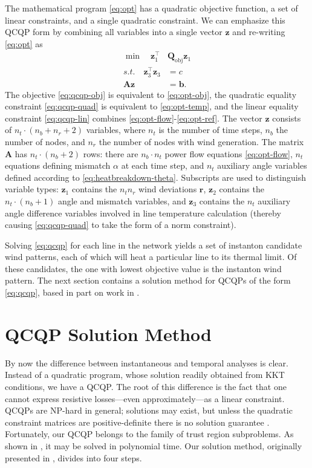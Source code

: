 \documentclass[journal,twoside]{IEEEtran}
\renewcommand{\vec}[1]{\mathbf{#1}}
\begin{document}
The mathematical program \eqref{eq:opt} has a quadratic objective function, a set of linear constraints, and a single quadratic constraint. We can emphasize this QCQP form by combining all variables into a single vector $\mathbf{z}$ and re-writing \eqref{eq:opt} as
\begin{subequations}\label{eq:qcqp}
\begin{align}
\label{eq:qcqp-obj} \min\quad \vec{z}_1^\top &\mathbf{Q}_\text{obj} \vec{z}_1 \\
\label{eq:qcqp-quad}s.t.\quad \vec{z}_3^\top \vec{z}_3 &= c \\
\label{eq:qcqp-lin} \mathbf{A}\vec{z} &= \vec{b}.
\end{align}
\end{subequations}
The objective \eqref{eq:qcqp-obj} is equivalent to \eqref{eq:opt-obj}, the quadratic equality constraint \eqref{eq:qcqp-quad} is equivalent to \eqref{eq:opt-temp}, and the linear equality constraint \eqref{eq:qcqp-lin} combines \eqref{eq:opt-flow}-\eqref{eq:opt-ref}. The vector $\vec{z}$ consists of $n_t\cdot(n_b+n_r+2)$ variables, where $n_t$ is the number of time steps, $n_b$ the number of nodes, and $n_r$ the number of nodes with wind generation. The matrix $\mathbf{A}$ has $n_t\cdot(n_b+2)$ rows: there are $n_b\cdot n_t$ power flow equations \eqref{eq:opt-flow}, $n_t$ equations defining mismatch $\alpha$ at each time step, and $n_t$ auxiliary angle variables defined according to \eqref{eq:heatbreakdown-theta}. Subscripts are used to distinguish variable types: $\vec{z}_1$ contains the $n_t n_r$ wind deviations $\vec{r}$, $\vec{z}_2$ contains the $n_t\cdot(n_b+1)$ angle and mismatch variables, and $\vec{z}_3$ contains the $n_t$ auxiliary angle difference variables involved in line temperature calculation (thereby causing \eqref{eq:qcqp-quad} to take the form of a norm constraint).

Solving \eqref{eq:qcqp} for each line in the network yields a set of instanton candidate wind patterns, each of which will heat a particular line to its thermal limit. Of these candidates, the one with lowest objective value is the instanton wind pattern. The next section contains a solution method for QCQPs of the form \eqref{eq:qcqp}, based in part on work in \cite{bienstock2014}.

\section{QCQP Solution Method}\label{sec:solution}
By now the difference between instantaneous and temporal analyses is clear. Instead of a quadratic program, whose solution readily obtained from KKT conditions, we have a QCQP. The root of this difference is the fact that one cannot express resistive losses---even approximately---as a linear constraint. QCQPs are NP-hard in general; solutions may exist, but unless the quadratic constraint matrices are positive-definite there is no solution guarantee \cite{mehanna2014}. Fortunately, our QCQP belongs to the family of trust region subproblems. As shown in \cite{bienstock2014}, it may be solved in polynomial time. Our solution method, originally presented in \cite{kersulis2015}, divides into four steps.
\end{document}

